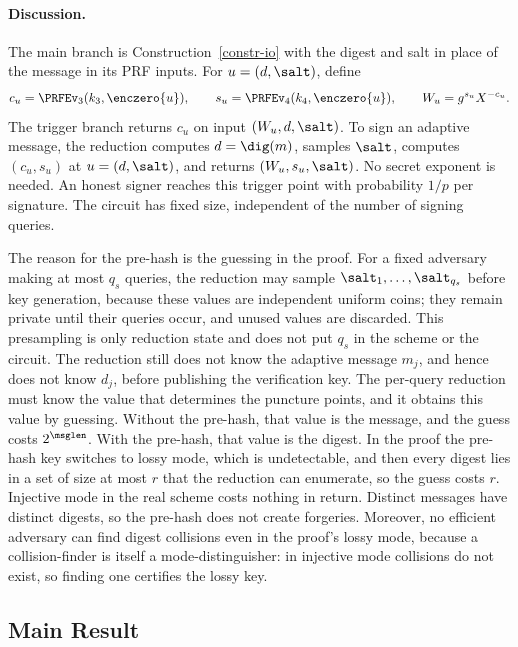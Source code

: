 \paragraph*{Discussion.} The main branch is Construction~\ref{constr-io} with the digest and salt in place of the message in its PRF inputs. For $u=(d,\salt)$, define
$$
c_u=\PRFEv_3(k_3,\enczero{u}),
\qquad
s_u=\PRFEv_4(k_4,\enczero{u}),
\qquad
W_u=g^{s_u}X^{-c_u}.
$$
The trigger branch returns $c_u$ on input $(W_u,d,\salt)$. To sign an adaptive message, the reduction computes $d=\dig(m)$, samples $\salt$, computes $(c_u,s_u)$ at $u=(d,\salt)$, and returns $(W_u,s_u,\salt)$. No secret exponent is needed. An honest signer reaches this trigger point with probability $1/p$ per signature. The circuit has fixed size, independent of the number of signing queries.

The reason for the pre-hash is the guessing in the proof. For a fixed adversary making at most $q_s$ queries, the reduction may sample $\salt_1,\ldots,\salt_{q_s}$ before key generation, because these values are independent uniform coins; they remain private until their queries occur, and unused values are discarded. This presampling is only reduction state and does not put $q_s$ in the scheme or the circuit. The reduction still does not know the adaptive message $m_j$, and hence does not know $d_j$, before publishing the verification key. The per-query reduction must know the value that determines the puncture points, and it obtains this value by guessing. Without the pre-hash, that value is the message, and the guess costs $2^{\msglen}$. With the pre-hash, that value is the digest. In the proof the pre-hash key switches to lossy mode, which is undetectable, and then every digest lies in a set of size at most $r$ that the reduction can enumerate, so the guess costs $r$. Injective mode in the real scheme costs nothing in return. Distinct messages have distinct digests, so the pre-hash does not create forgeries. Moreover, no efficient adversary can find digest collisions even in the proof's lossy mode, because a collision-finder is itself a mode-distinguisher: in injective mode collisions do not exist, so finding one certifies the lossy key.

\subsection{Main Result} \label{sec-salted-proof}

